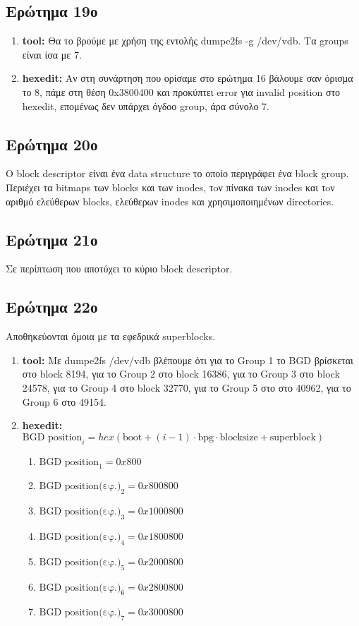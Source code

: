 \documentclass{article}
\begin{document}
\subsection{Ερώτημα 19ο}
\begin{enumerate}
    \item{\textbf{tool:} Θα το βρούμε με χρήση της εντολής dumpe2fs -g /dev/vdb. Τα groups είναι ίσα με 7.}
    \item{\textbf{hexedit:} Αν στη συνάρτηση που ορίσαμε στο ερώτημα 16 βάλουμε σαν όρισμα το 8, πάμε στη θέση
            0x3800400 και προκύπτει error για invalid position στο hexedit, επομένως δεν υπάρχει όγδοο group, άρα σύνολο 7.}
\end{enumerate}
\subsection{Ερώτημα 20ο}
Ο block descriptor είναι ένα data structure το οποίο περιγράφει ένα block group. Περιέχει 
τα bitmaps των blocks και των inodes, τoν πίνακα των inodes και τoν αριθμό ελεύθερων blocks, 
ελεύθερων inodes και χρησιμοποιημένων directories.\\
\subsection{Ερώτημα 21ο}
Σε περίπτωση που αποτύχει το κύριο block descriptor. \\
\subsection{Ερώτημα 22ο}
Αποθηκεύονται όμοια με τα εφεδρικά superblocks.
\begin{enumerate}
    \item{\textbf{tool:} Με dumpe2fs /dev/vdb βλέπουμε ότι για το Group 1 το BGD βρίσκεται στο block 8194, για το 
        Group 2 στο block 16386, για το Group 3 στο block 24578, για το Group 4 στο block 32770, για το Group 5 στο
        στο 40962, για το Group 6 στο 49154.}
    \item{\textbf{hexedit:} $\text{BGD position}_{i} = hex(\text{boot}+(i-1)\cdot\text{bpg}\cdot \text{blocksize}
        + \text{superblock})$
    \begin{enumerate}
            \item{$\text{BGD position}_{1} = 0x800$}
            \item{$\text{BGD position(εφ.)}_{2} = 0x800800$}
            \item{$\text{BGD position(εφ.)}_{3} = 0x1000800$}
            \item{$\text{BGD position(εφ.)}_{4} = 0x1800800$}
            \item{$\text{BGD position(εφ.)}_{5} = 0x2000800$}
            \item{$\text{BGD position(εφ.)}_{6} = 0x2800800$}
            \item{$\text{BGD position(εφ.)}_{7} = 0x3000800$}
    \end{enumerate}}
\end{enumerate}
\end{document}
